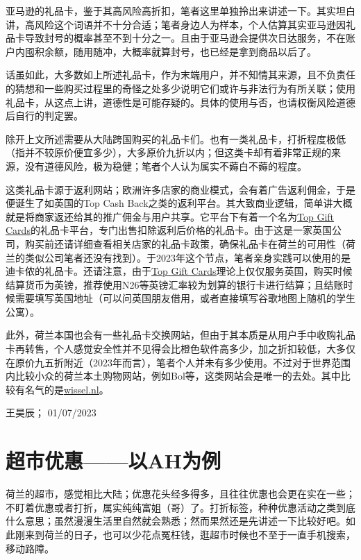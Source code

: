 亚马逊的礼品卡，鉴于其高风险高折扣，笔者这里单独拎出来讲述一下。其实坦白讲，高风险这个词语并不十分合适；笔者身边人为样本，个人估算其实亚马逊因礼品卡导致封号的概率甚至不到十分之一。且由于亚马逊会提供次日达服务，不在账户内囤积余额，随用随冲，大概率就算封号，也已经是拿到商品以后了。

话虽如此，大多数如上所述礼品卡，作为末端用户，并不知情其来源，且不负责任的猜想和一些购买过程里的奇怪之处多少说明它们或许与非法行为有所关联；使用礼品卡，从这点上讲，道德性是可能存疑的。具体的使用与否，也请权衡风险道德后自行的判定罢。

除开上文所述需要从大陆跨国购买的礼品卡们。也有一类礼品卡，打折程度极低（指并不较原价便宜多少），大多原价九折以内；但这类卡却有着非常正规的来源，没有道德风险，极为稳健；笔者个人认为属实不薅白不薅的程度。

这类礼品卡源于返利网站；欧洲许多店家的商业模式，会有着广告返利佣金，于是便诞生了如英国的Top Cash Back之类的返利平台。其大致商业逻辑，简单讲大概就是将商家返还给其的推广佣金与用户共享。它平台下有着一个名为\href{https://www.topcashback.co.uk/top-gift-cards/}{\uline{Top Gift Cards}}的礼品卡平台，专门出售扣除返利后价格的礼品卡。由于这是一家英国公司，购买前还请详细查看相关店家的礼品卡政策，确保礼品卡在荷兰的可用性（荷兰的类似公司笔者还没有找到）。于2023年这个节点，笔者亲身实践可以使用的是迪卡侬的礼品卡。还请注意，由于\href{https://www.topcashback.co.uk/top-gift-cards/}{\uline{Top Gift Cards}}理论上仅仅服务英国，购买时候结算货币为英镑，推荐使用N26等英镑汇率较为划算的银行卡进行结算；且结账时候需要填写英国地址（可以问英国朋友借用，或者直接填写谷歌地图上随机的学生公寓）。

此外，荷兰本国也会有一些礼品卡交换网站，但由于其本质是从用户手中收购礼品卡再转售，个人感觉安全性并不见得会比橙色软件高多少，加之折扣较低，大多仅在原价九五折附近（2023年而言），笔者个人并未有多少使用。不过对于世界范围内比较小众的荷兰本土购物网站，例如Bol等，这类网站会是唯一的去处。其中比较有名气的是\href{https://en.wissel.nl/}{\uline{wissel.nl}}。

\begin{flushright}
王昊辰； 01/07/2023
\end{flushright}

\vspace{\betsubsec} %

\section{超市优惠——以AH为例}
荷兰的超市，感觉相比大陆；优惠花头经多得多，且往往优惠也会更在实在一些；不盯着优惠或者打折，属实纯纯富姐（哥）了。打折标签，种种优惠活动之类到底什么意思；虽然漫漫生活里自然就会熟悉；然而果然还是先讲述一下比较好吧。如此刚来到荷兰的日子，也可以少花点冤枉钱，逛超市时候也不至于一直手机搜索，移动路障。

